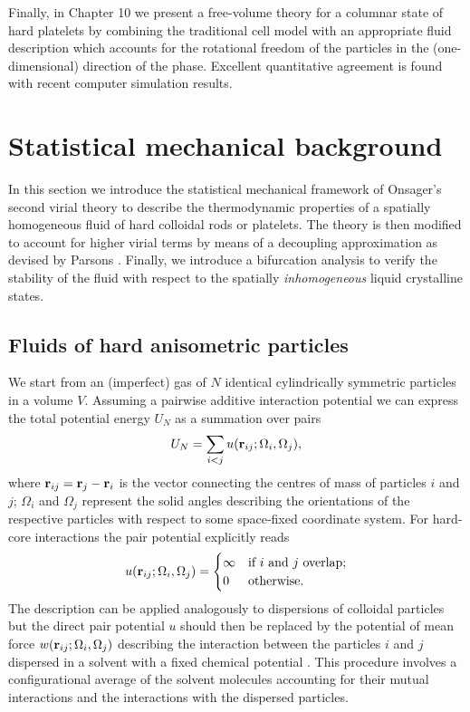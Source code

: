\documentclass[amssymb]{revtex4}
\newcommand{\bfr}{{\bf r}}
\begin{document}
Finally, in Chapter  10  we present a free-volume theory for a columnar state of hard platelets  by combining the traditional cell model with an appropriate fluid description which accounts for the rotational freedom of the particles in the (one-dimensional) direction of the phase. Excellent quantitative agreement is found with recent computer simulation results.   



\section{Statistical mechanical background}
\noindent In this section we introduce the statistical mechanical framework
of  Onsager's second virial theory \cite{Onsager,Vroege92,Cotter} to 
describe the thermodynamic properties of a spatially homogeneous fluid of 
hard colloidal rods or 
platelets. The theory is then modified to account for 
higher virial terms by means of a decoupling approximation as devised by Parsons \cite{Parsons}.
Finally, we introduce a bifurcation analysis to verify  the stability of the  fluid 
with respect to the spatially {\em inhomogeneous} liquid crystalline states.

\subsection{Fluids of hard anisometric particles}
We start from an (imperfect) gas of $N$ identical cylindrically symmetric particles in a volume $V$.
Assuming a pairwise additive interaction potential we can express the total potential energy $U_{N}$  as a summation over pairs
\begin{equation}
U_{N}=\sum_{i<j} u(\bfr_{ij}; \Omega_{i}, \Omega_{j}), 
\end{equation}
where $\bfr_{ij}=\bfr _{j}- \bfr _{i}$ is the vector connecting the centres of mass of particles $i$ and $j$;
$\Omega_{i}$ and $\Omega_{j}$ represent the solid angles describing the orientations of
the respective particles with respect to some space-fixed coordinate system.
For hard-core interactions the pair potential explicitly reads
\begin{equation}
u(\bfr_{ij}; \Omega_{i}, \Omega_{j}) = 
\begin{cases}
\infty  &\text{if $i$ and $j$ overlap;} \\
0 &\text{otherwise.} \label{0pairpot}
\end{cases}
\end{equation}
The  description can be applied analogously to dispersions of colloidal particles
 but the direct pair potential $u$
 should then be replaced by the potential of mean force $w(\bfr_{ij};\Omega_{i},\Omega_{j})$ describing
the interaction between the  particles $i$ and $j$  
dispersed in a  solvent with a fixed chemical potential \cite{macmillan,Hill}. 
This procedure involves a configurational average of the solvent molecules accounting for
their mutual interactions and the interactions with the dispersed particles.
\end{document}
